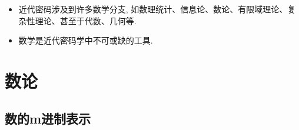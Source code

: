\documentclass[UTF8]{ctexart}
\begin{document}
    \begin{itemize}
        \renewcommand{\labelitemi}{\scriptsize$\blacksquare$}
        \item 近代密码涉及到许多数学分支, 如数理统计、信息论、数论、有限域理论、复杂性理论、甚至于代数、几何等.
        \item 数学是近代密码学中不可或缺的工具.
    \end{itemize}

    \section{数论}

    \subsection{数的m进制表示}
\end{document}
